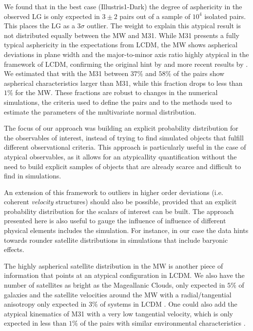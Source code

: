 \documentclass[a4paper,fleqn,usenatbib]{mnras}
\begin{document}
We found that in the best case (Illustris1-Dark) the degree of
asphericity in the observed LG is only expected in $3\pm2$ pairs out
of a sample of $10^4$ isolated pairs. 
This places the LG as a $3\sigma$ outlier.   
The weight to explain this atypical result is not distributed equally
between the MW and M31. 
While M31 presents a fully typical asphericity in the expectations
from LCDM, the MW shows aspherical deviations in plane width and the
major-to-minor axis ratio highly atypical in the framework of LCDM,
confirming the original hint by \cite{2005A&A...431..517K} and more
recent results by \cite{2015ApJ...815...19P}. 
We estimated that with the M31 between $37\%$ and $58\%$ of the pairs show aspherical characteristics larger than M31, while
this fraction drops to less than $1\%$ for the MW. 
These fractions are robust to changes in the numerical simulations, 
the criteria used to define the pairs and to the methods used to
estimate the parameters of the multivariate normal distribution. 


The focus of our approach was building an explicit probability
distribution for the observables of interest, instead of trying to
find simulated objects that fulfill different observational criteria. 
This approach is particularly useful in the case of atypical
observables, as it allows for an atypicallity
quantification without the need to build explicit samples of objects
that are already scarce and difficult to find in simulations.

An extension of this framework to outliers in higher order deviations
(i.e. coherent \emph{velocity} structures) should also be possible, 
provided that an explicit probability distribution for the scalars of
interest can be built.  
The approach presented here is also useful to gauge the influence of 
influence of different physical elements includes the simulation. 
For instance, in our case the data hints towards rounder satellite
distributions in simulations that include baryonic effects.   


The highly aspherical satellite distribution in the MW is another piece of
information that points at an atypical configuration in LCDM.
We also have the number of satellites as bright as the Mageallanic
Clouds, only expected in $5\%$ of galaxies
\citep{2011ApJ...743..117B} and 
the satellite velocities around the MW with a radial/tangential
anisotropy only expected in $3\%$ of systems in LCDM
\citep{2017MNRAS.468L..41C}. 
One could also add the atypical kinematics of M31 with a very low
tangential velocity, which is only expected in less than $1\%$ of the pairs
with similar environmental characteristics \citep{ForeroRomero2013}.  
\end{document}

